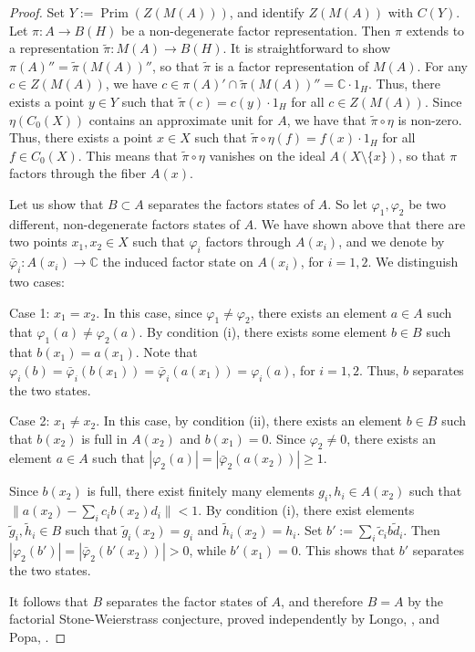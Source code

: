 \documentclass{amsart}
\theoremstyle{definition}
\begin{document}
\begin{proof}
    Set $Y:=\operatorname{Prim}(Z(M(A)))$, and identify $Z(M(A))$ with $C(Y)$.
    Let $\pi\colon A\to B(H)$ be a non-degenerate factor representation.
    Then $\pi$ extends to a representation $\tilde{\pi}\colon M(A)\to B(H)$.
    It is straightforward to show $\pi(A)''=\tilde{\pi}(M(A))''$, so that $\tilde{\pi}$ is a factor representation of $M(A)$.
    For any $c\in Z(M(A))$, we have $c\in \pi(A)'\cap \tilde{\pi}(M(A))'' = {{\mathbb{C}}}\cdot 1_H$.
    Thus, there exists a point $y\in Y$ such that $\tilde{\pi}(c)=c(y)\cdot 1_H$ for all $c\in Z(M(A))$.
    Since $\eta(C_0(X))$ contains an approximate unit for $A$, we have that $\tilde{\pi}\circ\eta$ is non-zero.
    Thus, there exists a point $x\in X$ such that $\tilde{\pi}\circ\eta(f)=f(x)\cdot 1_H$ for all $f\in C_0(X)$.
    This means that $\tilde{\pi}\circ\eta$ vanishes on the ideal $A(X\setminus\{x\})$, so that $\pi$ factors through the fiber $A(x)$.

    Let us show that $B\subset A$ separates the factors states of $A$.
    So let $\varphi_1,\varphi_2$ be two different, non-degenerate factors states of $A$.
    We have shown above that there are two points $x_1,x_2\in X$ such that $\varphi_i$ factors through $A(x_i)$, and we denote by $\bar{\varphi}_i\colon A(x_i)\to{{\mathbb{C}}}$ the induced factor state on $A(x_i)$, for $i=1,2$.
    We distinguish two cases:

    Case 1: $x_1=x_2$.
    In this case, since $\varphi_1\neq\varphi_2$, there exists an element $a\in A$ such that $\varphi_1(a)\neq\varphi_2(a)$.
    By condition (i), there exists some element $b\in B$ such that $b(x_1)=a(x_1)$.
    Note that $\varphi_i(b)=\bar{\varphi}_i(b(x_1))=\bar{\varphi}_i(a(x_1))=\varphi_i(a)$, for $i=1,2$.
    Thus, $b$ separates the two states.

    Case 2: $x_1\neq x_2$.
    In this case, by condition (ii), there exists an element $b\in B$ such that $b(x_2)$ is full in $A(x_2)$ and $b(x_1)=0$.
    Since $\varphi_2\neq 0$, there exists an element $a\in A$ such that $|\varphi_2(a)|=|\bar{\varphi}_2(a(x_2))|\geq 1$.

    Since $b(x_2)$ is full, there exist finitely many elements $g_i,h_i\in A(x_2)$ such that $\|a(x_2)-\sum_i c_ib(x_2)d_i\|<1$.
    By condition (i), there exist elements $\tilde{g}_i,\tilde{h}_i\in B$ such that $\tilde{g}_i(x_2)=g_i$ and $\tilde{h}_i(x_2)=h_i$.
    Set $b':=\sum_i\tilde{c}_ib\tilde{d}_i$.
    Then $|\varphi_2(b')|=|\bar{\varphi}_2(b'(x_2))|>0$, while $b'(x_1)=0$.
    This shows that $b'$ separates the two states.

    It follows that $B$ separates the factor states of $A$, and therefore $B=A$ by the factorial Stone-Weierstrass conjecture, proved independently by Longo, \cite{Lon1984}, and Popa, \cite{Pop1984}.
\end{proof}
\end{document}
